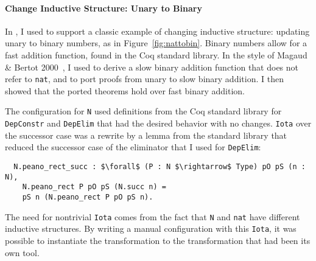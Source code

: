 \paragraph{Change Inductive Structure: Unary to Binary}
In \href{https://github.com/uwplse/pumpkin-pi/blob/v2.0.0/plugin/coq/nonorn.v}{}, I used \toolnamec to support a classic example of changing inductive structure:
updating unary to binary numbers,
as in Figure~\ref{fig:nattobin}.
Binary numbers allow for a fast addition function, found in the Coq standard library.
In the style of Magaud \& Bertot 2000~\cite{magaud2000changing}, I used \toolnamec to derive a slow binary
addition function that does not refer to \lstinline{nat},
and to port proofs from unary to slow binary addition.
I then showed that the ported theorems hold over fast binary addition.

The configuration for \lstinline{N} used definitions from the Coq standard library
for \lstinline{DepConstr} and \lstinline{DepElim} that had the desired behavior with no changes.
\lstinline{Iota} over the successor case was a rewrite by a lemma
from the standard library that reduced the successor case of the eliminator that I used for \lstinline{DepElim}:

\begin{lstlisting}
  N.peano_rect_succ : $\forall$ (P : N $\rightarrow$ Type) pO pS (n : N),
    N.peano_rect P pO pS (N.succ n) =
    pS n (N.peano_rect P pO pS n).
\end{lstlisting}
%
The need for nontrivial \lstinline{Iota} comes from the fact that \lstinline{N} and \lstinline{nat}
have different inductive structures.
By writing a manual configuration with this \lstinline{Iota}, it was possible to instantiate the \toolnamec transformation
to the transformation that had been its own tool.

